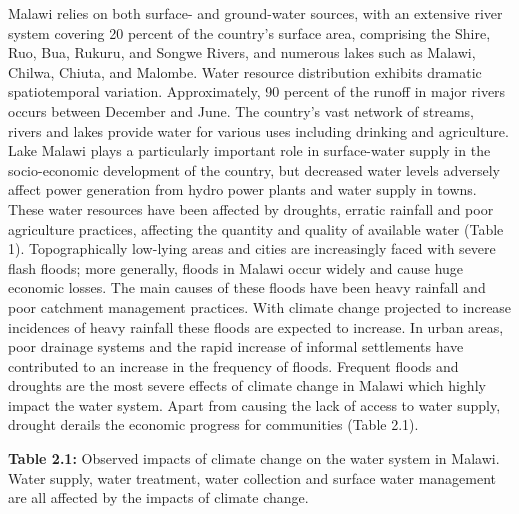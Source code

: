 \documentclass[
]{book}
\begin{document}
Malawi relies on both surface- and ground-water sources, with an extensive river system covering 20 percent of the country's surface area, comprising the Shire,
Ruo, Bua, Rukuru, and Songwe Rivers, and numerous lakes such as Malawi, Chilwa, Chiuta, and Malombe. Water resource distribution exhibits dramatic spatiotemporal
variation. Approximately, 90 percent of the runoff in major rivers occurs between December and June. The country's vast network of streams, rivers and lakes
provide water for various uses including drinking and agriculture. Lake Malawi plays a particularly important role in surface-water supply in the socio-economic
development of the country, but decreased water levels adversely affect power generation from hydro power plants and water supply in towns. These water resources
have been affected by droughts, erratic rainfall and poor agriculture practices, affecting the quantity and quality of available water (Table 1). Topographically
low-lying areas and cities are increasingly faced with severe flash floods; more generally, floods in Malawi occur widely and cause huge economic losses. The
main causes of these floods have been heavy rainfall and poor catchment management practices. With climate change projected to increase incidences of heavy
rainfall these floods are expected to increase. In urban areas, poor drainage systems and the rapid increase of informal settlements have contributed to an
increase in the frequency of floods. Frequent floods and droughts are the most severe effects of climate change in Malawi which highly impact the water system.
Apart from causing the lack of access to water supply, drought derails the economic progress for communities (Table 2.1).

\textbf{Table 2.1:} Observed impacts of climate change on the water system in Malawi. Water supply, water treatment, water collection and surface water management are all affected by the impacts of climate change.
\end{document}
